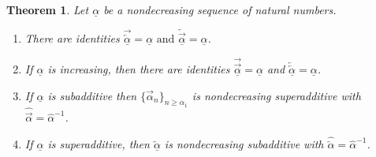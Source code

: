 \documentclass[12pt, reqno]{amsart}
\numberwithin{equation}{section}
\def\a{\ensuremath{\alpha}}
\def\ua{\ensuremath{\underline{\alpha}}}
\newcommand{\wa}{\widehat{\alpha}}
\newcommand{\wb}{\widehat{\beta}}
\theoremstyle{plain} %
\newtheorem{thm}{Theorem}[section]
\theoremstyle{definition}
\theoremstyle{remark}
\newcommand{\uao}{\overleftarrow{\ua}}
\newcommand{\uau}{\overrightarrow{\ua}}
\newcommand{\ao}{\overleftarrow{\alpha}}
\newcommand{\au}{\overrightarrow{\alpha}}
\begin{document}
\begin{thm}%
\label{lem:DualityProperties}
Let $\ua$ be a nondecreasing sequence of natural numbers. 
\begin{enumerate}
\item There are identities
$\overrightarrow{\uao}=\ua \text{ and } \overleftarrow{\uau}=\ua$.
\item 
If $\ua$ is increasing, then there are identities
$\overrightarrow{\uau}=\ua$  and  $\overleftarrow{\uao}=\ua$.

\item  If $\ua$ is subadditive  then $\{\au_n\}_{n\geq \a_1}$ is nondecreasing superadditive with  $\widehat{\au} = \widehat{\a}^{-1}$.
\item  If $\ua$ is superadditive, then $\uao$ is nondecreasing subadditive with $\widehat{\ao} =\widehat{\a}^{-1}$.
\end{enumerate}
\end{thm}
\end{document}
